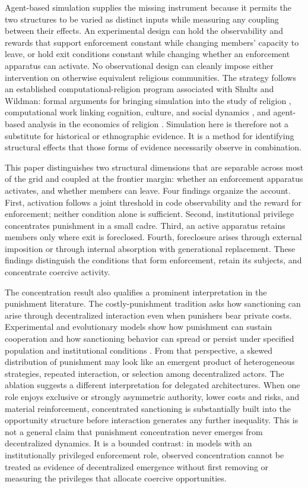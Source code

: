 \documentclass[12pt]{article}
\begin{document}
Agent-based simulation supplies the missing instrument because it permits the two structures to be varied as distinct inputs while measuring any coupling between their effects. An experimental design can hold the observability and rewards that support enforcement constant while changing members' capacity to leave, or hold exit conditions constant while changing whether an enforcement apparatus can activate. No observational design can cleanly impose either intervention on otherwise equivalent religious communities. The strategy follows an established computational-religion program associated with Shults and Wildman: formal arguments for bringing simulation into the study of religion \citep{wildmansosis2011}, computational work linking cognition, culture, and social dynamics \citep{gorelemosshultswildman2018}, and agent-based analysis in the economics of religion \citep{iannacconemakowsky2007}. Simulation here is therefore not a substitute for historical or ethnographic evidence. It is a method for identifying structural effects that those forms of evidence necessarily observe in combination.

This paper distinguishes two structural dimensions that are separable across most of the grid and coupled at the frontier margin: whether an enforcement apparatus activates, and whether members can leave. Four findings organize the account. First, activation follows a joint threshold in code observability and the reward for enforcement; neither condition alone is sufficient. Second, institutional privilege concentrates punishment in a small cadre. Third, an active apparatus retains members only where exit is foreclosed. Fourth, foreclosure arises through external imposition or through internal absorption with generational replacement. These findings distinguish the conditions that form enforcement, retain its subjects, and concentrate coercive activity.

The concentration result also qualifies a prominent interpretation in the punishment literature. The costly-punishment tradition asks how sanctioning can arise through decentralized interaction even when punishers bear private costs. Experimental and evolutionary models show how punishment can sustain cooperation and how sanctioning behavior can spread or persist under specified population and institutional conditions \citep{fehrgachter2000,boydgintisbowles2010,hauertetal2007}. From that perspective, a skewed distribution of punishment may look like an emergent product of heterogeneous strategies, repeated interaction, or selection among decentralized actors. The ablation suggests a different interpretation for delegated architectures. When one role enjoys exclusive or strongly asymmetric authority, lower costs and risks, and material reinforcement, concentrated sanctioning is substantially built into the opportunity structure before interaction generates any further inequality. This is not a general claim that punishment concentration never emerges from decentralized dynamics. It is a bounded contrast: in models with an institutionally privileged enforcement role, observed concentration cannot be treated as evidence of decentralized emergence without first removing or measuring the privileges that allocate coercive opportunities.
\end{document}
